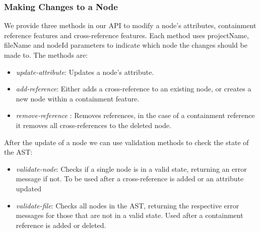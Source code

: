 \documentclass{article}
\begin{document}
{\subsubsection{Making Changes to a Node}
We provide three methods in our API to modify a node's attributes, containment reference features and cross-reference features. Each method uses projectName, fileName and nodeId parameters to indicate which node the changes should be made to. The methods are: 
\begin{itemize}
\item \emph{update-attribute}: Updates a node's attribute.
\item \emph{add-reference}: Either adds a cross-reference to an existing node, or creates a new node within a containment feature.
\item \emph{remove-reference} : Removes references, in the case of a containment reference it removes all cross-references to the deleted node.
\end{itemize} 
After the update of a node we can use validation methods to check the state of the AST:
\begin{itemize}
\item \emph{validate-node}: Checks if a single node is in a valid state, returning an error message if not. To be used after a cross-reference is added or an attribute updated
\item \emph{validate-file}: Checks all nodes in the AST, returning the respective error messages for those that are not in a valid state. Used after a containment reference is added or deleted.
\end{itemize}

}
\end{document}
